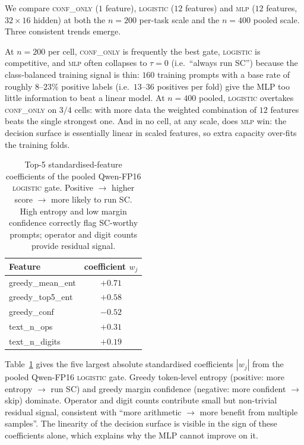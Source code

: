 \documentclass[11pt]{article}
\begin{document}
We compare \textsc{conf\_only} ($1$ feature), \textsc{logistic}
($12$ features) and \textsc{mlp} ($12$ features, $32\times 16$
hidden) at both the $n{=}200$ per-task scale and the $n{=}400$
pooled scale. Three consistent trends emerge.

At $n{=}200$ per cell, \textsc{conf\_only} is frequently the best
gate, \textsc{logistic} is competitive, and \textsc{mlp} often
collapses to $\tau{=}0$ (i.e.\ ``always run SC'') because the
class-balanced training signal is thin: $160$ training prompts with
a base rate of roughly $8$--$23\%$ positive labels (i.e.\ $13$--$36$
positives per fold) give the MLP too little information to beat a
linear model. At $n{=}400$ pooled,
\textsc{logistic} overtakes \textsc{conf\_only} on $3/4$ cells: with
more data the weighted combination of $12$ features beats the
single strongest one. And in no cell, at any scale, does
\textsc{mlp} win: the decision surface is essentially linear in
scaled features, so extra capacity over-fits the training folds.

\begin{table}[t]
\centering\small
\begin{tabular}{lc}
\toprule
Feature & coefficient $w_j$ \\
\midrule
greedy\_mean\_ent  & $+0.71$ \\
greedy\_top5\_ent  & $+0.58$ \\
greedy\_conf       & $-0.52$ \\
text\_n\_ops       & $+0.31$ \\
text\_n\_digits    & $+0.19$ \\
\bottomrule
\end{tabular}
\caption{Top-5 standardised-feature coefficients of the pooled
Qwen-FP16 \textsc{logistic} gate. Positive $\to$ higher score $\to$
more likely to run SC. High entropy and low margin confidence
correctly flag SC-worthy prompts; operator and digit counts provide
residual signal.}
\label{tab:coef}
\end{table}

Table~\ref{tab:coef} gives the five largest absolute standardised
coefficients $|w_j|$ from the pooled Qwen-FP16 \textsc{logistic}
gate. Greedy token-level entropy (positive: more entropy $\to$ run
SC) and greedy margin confidence (negative: more confident $\to$
skip) dominate. Operator and digit counts contribute small but
non-trivial residual signal, consistent with ``more arithmetic $\to$
more benefit from multiple samples''. The linearity of the decision
surface is visible in the sign of these coefficients alone, which
explains why the MLP cannot improve on it.
\end{document}
